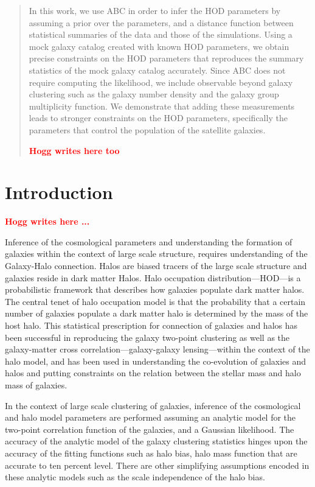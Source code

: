 \documentclass[12pt, preprint]{aastex}
\newcommand{\todo}[1]{{\bf \textcolor{red}{ #1}}}
\begin{document}
\begin{abstract}
In this work, we use ABC in order to infer the HOD parameters by assuming a prior over the parameters, and a distance function between 
statistical summaries of the data and those of the simulations.
Using a mock galaxy catalog created with known HOD parameters, we obtain precise constraints on the HOD parameters that 
reproduces the summary statistics of the mock galaxy catalog accurately. 
Since ABC does not require computing the likelihood, we include observable beyond galaxy clustering such as 
the galaxy number density and the galaxy group multiplicity function. 
We demonstrate that adding these measurements leads to stronger constraints on the HOD parameters, specifically the parameters 
that control the population of the satellite galaxies.

\todo{Hogg writes here too}

\end{abstract}

\section{Introduction}

\todo{Hogg writes here ...}

Inference of the cosmological parameters and understanding the formation of galaxies within the context of large scale 
structure, requires understanding of the Galaxy-Halo connection. Halos are biased tracers of the large scale structure 
and galaxies reside in dark matter Halos. Halo occupation distribution---HOD---is a probabilistic framework that describes how galaxies populate dark matter halos. The central tenet of halo occupation model is that the probability that a certain number of galaxies populate a dark matter halo is determined by the mass of the host halo. This statistical prescription for connection of galaxies and halos has been successful in reproducing the galaxy two-point clustering as well as the galaxy-matter cross correlation---galaxy-galaxy 
lensing---within the context of the halo model, and has been used in understanding the co-evolution of galaxies and halos and putting constraints on the relation between the stellar mass and halo mass of galaxies.

In the context of large scale clustering of galaxies, inference of the cosmological and halo model parameters are performed assuming an analytic model for the two-point correlation function of the galaxies, and a Gaussian likelihood. The accuracy of the analytic model of the galaxy clustering statistics hinges upon the accuracy of the fitting functions such as halo bias, halo mass function that are accurate to ten percent level. There are other simplifying assumptions encoded in these analytic models such as the scale independence of the halo bias. 
\end{document}

